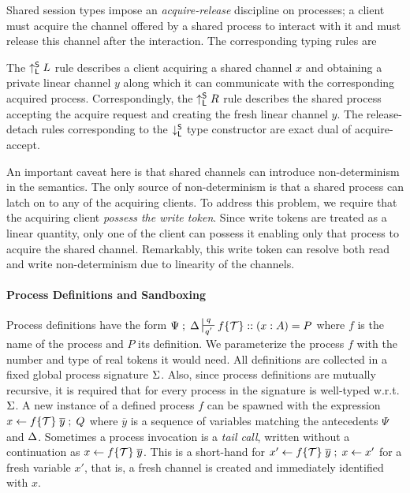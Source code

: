Shared session types impose an \emph{acquire-release} discipline on processes; 
a client must acquire the channel offered by a shared process to interact with it
and must release this channel after the interaction.
The corresponding typing rules are
The $\up L$ rule describes a client acquiring a shared channel $x$
and obtaining a private linear channel $y$ along which it can communicate
with the corresponding acquired process.
Correspondingly, the $\up R$ rule describes the shared process
accepting the acquire request and creating the fresh linear channel $y$.
The release-detach rules corresponding to the $\down$ type constructor
are exact dual of acquire-accept.

An important caveat here is that shared channels can introduce non-determinism
in the semantics.
The only source of non-determinism is that a shared process can latch on to
any of the acquiring clients.
To address this problem, we require that the acquiring client \emph{possess
the write token}.
Since write tokens are treated as a linear quantity, only one of the client can
possess it enabling only that process to acquire the shared channel.
Remarkably, this write token can resolve both read and write non-determinism
due to linearity of the channels.


\paragraph*{\textbf{Process Definitions and Sandboxing}}
Process definitions have the form
$\Psi \semi \D \entailpot{q}{q'} f\{\Tokens\} :: (x : A) = P$ where $f$
is the name of the process and $P$ its definition.
We parameterize the process $f$ with the number and type of
real tokens it would need.
All definitions are collected in a fixed global process signature $\Sg$.
Also, since process definitions are mutually recursive, it is required that
for every process in the signature is well-typed w.r.t. $\Sg$.
A new instance of a defined process $f$ can be spawned with
the expression $\procdef{f\{\Tokens\}}{\overline{y}}{x} \semi Q$
where $\overline{y}$ is a sequence of variables matching the
antecedents $\Psi$ and $\D$.
Sometimes a process invocation is a \emph{tail call}, written without
a continuation as $\procdef{f\{\Tokens\}}{\overline{y}}{x}$.
This is a short-hand for
$\procdef{f\{\Tokens\}}{\overline{y}}{x'} \semi \fwd{x}{x'}$ for a
fresh variable $x'$, that is, a fresh channel is created and
immediately identified with $x$.

